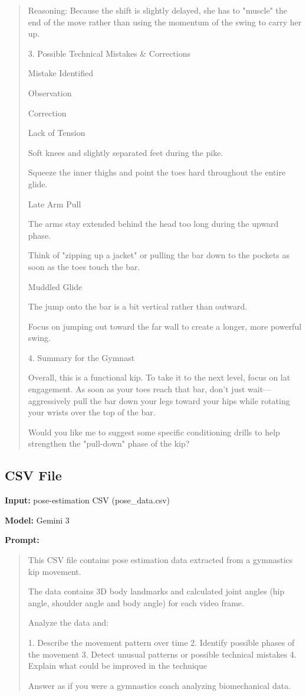 \begin{quote}
Reasoning: Because the shift is slightly delayed, she has to "muscle" the end of the move rather than using the momentum of the swing to carry her up.

3. Possible Technical Mistakes & Corrections

Mistake Identified

Observation

Correction

Lack of Tension

Soft knees and slightly separated feet during the pike.

Squeeze the inner thighs and point the toes hard throughout the entire glide.

Late Arm Pull

The arms stay extended behind the head too long during the upward phase.

Think of "zipping up a jacket" or pulling the bar down to the pockets as soon as the toes touch the bar.

Muddled Glide

The jump onto the bar is a bit vertical rather than outward.

Focus on jumping out toward the far wall to create a longer, more powerful swing.

4. Summary for the Gymnast

Overall, this is a functional kip. To take it to the next level, focus on lat engagement. As soon as your toes reach that bar, don't just wait—aggressively pull the bar down your legs toward your hips while rotating your wrists over the top of the bar.

Would you like me to suggest some specific conditioning drills to help strengthen the "pull-down" phase of the kip?
\end{quote}

\newpage
\subsection{CSV File}

\textbf{Input:} pose-estimation CSV (pose\_data.csv)

\textbf{Model:} Gemini 3

\textbf{Prompt:}

\begin{quote}
This CSV file contains pose estimation data extracted from a
gymnastics kip movement.

The data contains 3D body landmarks and calculated joint angles
(hip angle, shoulder angle and body angle) for each video frame.

Analyze the data and:

1. Describe the movement pattern over time
2. Identify possible phases of the movement
3. Detect unusual patterns or possible technical mistakes
4. Explain what could be improved in the technique

Answer as if you were a gymnastics coach analyzing biomechanical data.
\end{quote}

